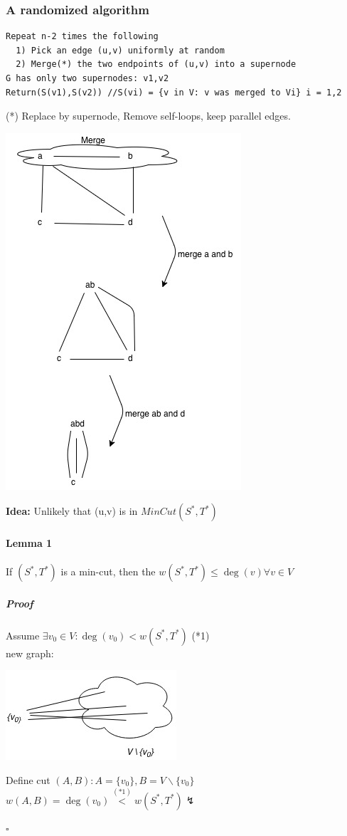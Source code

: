 \subsubsection{A randomized algorithm}
\begin{verbatim}
Repeat n-2 times the following
  1) Pick an edge (u,v) uniformly at random
  2) Merge(*) the two endpoints of (u,v) into a supernode
G has only two supernodes: v1,v2
Return(S(v1),S(v2)) //S(vi) = {v in V: v was merged to Vi} i = 1,2
\end{verbatim}
(*) Replace by supernode, Remove self-loops, keep parallel edges. \\
\begin{center} 
\includegraphics[scale=0.75]{img/sw435}
\end{center}
\textbf{Idea:} Unlikely that (u,v) is in $MinCut(S^*,T^*)$ \\
\paragraph{Lemma 1} If $(S^*,T^*)$ is a min-cut, then the $w(S^*,T^*) \leq \deg(v) \forall v \in V$
\subparagraph{Proof} Assume $\exists v_0 \in V: \deg(v_0) < w(S^*,T^*)$ (*1) \\
new graph: \\
\begin{center} 
\includegraphics[scale=0.75]{img/graph18}
\end{center} 
Define cut $(A,B): A= \{v_0\}, B= V \backslash \{v_0\}$ \\
$w(A,B) = \deg(v_0) \stackrel{(*1)}{<} w(S^*,T^*) \lightning$
\begin{flushright}
	$\square$
\end{flushright} 
